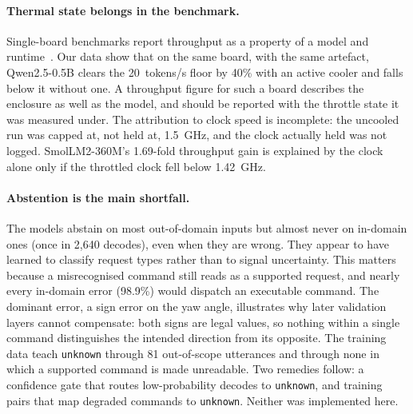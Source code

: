 \documentclass[a4paper,fleqn]{cas-dc}
\begin{document}
\paragraph{Thermal state belongs in the benchmark.} Single-board benchmarks report throughput as a
property of a model and runtime~\citep{sbc2025}. Our data show that on the same board, with the
same artefact, Qwen2.5-0.5B clears the 20~tokens/s floor by 40\% with an active cooler and falls
below it without one. A throughput figure for such a board describes the enclosure as well as the
model, and should be reported with the throttle state it was measured under. The attribution to
clock speed is incomplete: the uncooled run was capped at, not held at, 1.5~GHz, and the clock
actually held was not logged. SmolLM2-360M's 1.69-fold throughput gain is explained by the clock
alone only if the throttled clock fell below 1.42~GHz.

\paragraph{Abstention is the main shortfall.} The models abstain on most out-of-domain inputs but
almost never on in-domain ones (once in 2,640 decodes), even when they are wrong. They appear to
have learned to classify request types rather than to signal uncertainty. This matters because a
misrecognised command still reads as a supported request, and nearly every in-domain error
(98.9\%) would dispatch an executable command. The dominant error, a sign error on the yaw angle,
illustrates why later validation layers cannot compensate: both signs are legal values, so nothing
within a single command distinguishes the intended direction from its opposite.  The training data teach \texttt{unknown} through
81 out-of-scope utterances and through none in which a supported command is made unreadable. Two
remedies follow: a confidence gate that routes low-probability decodes to \texttt{unknown}, and
training pairs that map degraded commands to \texttt{unknown}. Neither was implemented here.
\end{document}
